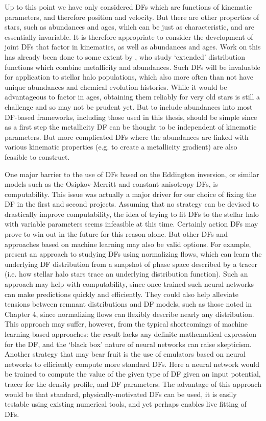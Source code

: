 Up to this point we have only considered DFs which are functions of kinematic parameters, and therefore position and velocity. But there are other properties of stars, such as abundances and ages, which can be just as characteristic, and are essentially invariable. It is therefore appropriate to consider the development of joint DFs that factor in kinematics, as well as abundances and ages. Work on this has already been done to some extent by \textcite{sanders15b}, who study `extended' distribution functions which combine metallicity and abundances. Such DFs will be invaluable for application to stellar halo populations, which also more often than not have unique abundances and chemical evolution histories. While it would be advantageous to factor in ages, obtaining them reliably for very old stars is still a challenge and so may not be prudent yet. But to include abundances into most DF-based frameworks, including those used in this thesis, should be simple since as a first step the metallicity DF can be thought to be independent of kinematic parameters. But more complicated DFs where the abundances are linked with various kinematic properties (e.g. to create a metallicity gradient) are also feasible to construct.

One major barrier to the use of DFs based on the Eddington inversion, or similar models such as the Osipkov-Merritt and constant-anisotropy DFs, is computability. This issue was actually a major driver for our choice of fixing the DF in the first and second projects. Assuming that no strategy can be devised to drastically improve computability, the idea of trying to fit DFs to the stellar halo with variable parameters seems infeasible at this time. Certainly action DFs may prove to win out in the future for this reason alone. But other DFs and approaches based on machine learning may also be valid options. For example, \textcite{green23} present an approach to studying DFs using normalizing flows, which can learn the underlying DF distribution from a snapshot of phase space described by a tracer (i.e. how stellar halo stars trace an underlying distribution function). Such an approach may help with computability, since once trained such neural networks can make predictions quickly and efficiently. They could also help alleviate tensions between remnant distributions and DF models, such as those noted in Chapter 4, since normalizing flows can flexibly describe nearly any distribution. This approach may suffer, however, from the typical shortcomings of machine learning-based approaches: the result lacks any definite mathematical expression for the DF, and the `black box' nature of neural networks can raise skepticism. Another strategy that may bear fruit is the use of emulators based on neural networks to efficiently compute more standard DFs. Here a neural network would be trained to compute the value of the given type of DF given an input potential, tracer for the density profile, and DF parameters. The advantage of this approach would be that standard, physically-motivated DFs can be used, it is easily testable using existing numerical tools, and yet perhaps enables live fitting of DFs.

